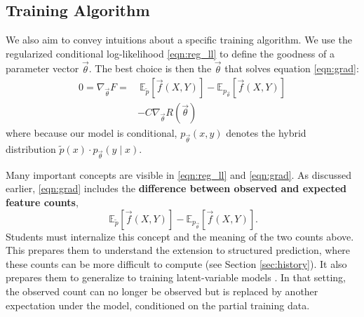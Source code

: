 \documentclass[11pt,letterpaper]{article}
\newcommand{\empirical}[0]{\ensuremath{\tilde{p}}}
\begin{document}
\subsection{Training Algorithm} 

We also aim to convey intuitions about a specific training algorithm.
We use the regularized conditional log-likelihood \eqref{eqn:reg_ll}
to define the goodness of a parameter vector $\vec{\theta}$.
The best choice is then the $\vec{\theta}$ that solves equation \eqref{eqn:grad}:
\begin{equation}
\begin{aligned}
0 = \nabla_{\vec{\theta}} F
 = &
\ \mathbb{E}_{\empirical{}}\left[\vec{f}(X,Y)\right] 
- \mathbb{E}_{{p_{\vec{\theta}}}}\left[\vec{f}(X,Y)\right]\\
 & - C \nabla_{\vec{\theta}}R(\vec{\theta})
\label{eqn:grad} 
\end{aligned}
\end{equation}
where because our model is conditional, $p_{\vec{\theta}}(x,y)$ denotes the hybrid distribution
$\empirical{}(x) \cdot p_{\vec{\theta}}(y\mid x)$.

Many important concepts are visible in \eqref{eqn:reg_ll} and \eqref{eqn:grad}.
%
As discussed earlier, \eqref{eqn:grad} includes the \textbf{difference between observed and
  expected feature counts}, 
\begin{equation}
\ \mathbb{E}_{\empirical{}}\left[\vec{f}(X,Y)\right] 
- \mathbb{E}_{p_{\vec{\theta}}}\left[\vec{f}(X,Y)\right].
\label{eqn:obsexp} 
\end{equation}
Students must internalize this concept and the meaning of the two counts above.
This prepares them to understand the extension to structured prediction,
where these counts can be more difficult to compute (see Section
\ref{sec:history}).  It also prepares them to generalize to training
latent-variable models \cite{petrov-klein-2008}.  In that setting, the
observed count can no longer be observed but is replaced by another
expectation under the model, conditioned on the partial training data.
\end{document}
